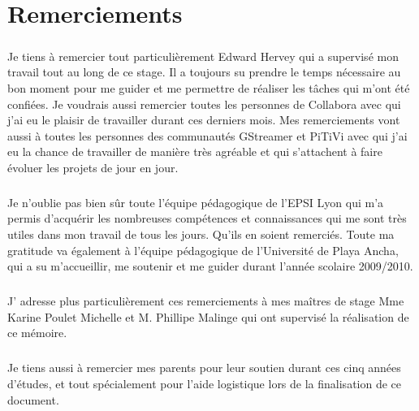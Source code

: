 \newpage \chapter*{Remerciements}

\paragraph {}

Je tiens à remercier tout particulièrement Edward Hervey qui a
supervisé mon travail tout au long de ce stage. Il a toujours su prendre
le temps nécessaire au bon moment pour me guider et me permettre
de réaliser les tâches qui m'ont été confiées.
Je voudrais aussi remercier toutes les personnes de Collabora
avec qui j'ai eu le plaisir de travailler durant ces derniers mois.
Mes remerciements vont aussi à toutes les personnes des communautés GStreamer
et PiTiVi avec qui j'ai eu la chance de travailler de manière très
agréable et qui s'attachent à faire évoluer les projets de jour en jour.

\paragraph {}

Je n'oublie pas bien sûr toute l'équipe pédagogique de l'EPSI Lyon
qui m'a permis d'acquérir les nombreuses compétences et connaissances
qui me sont très utiles dans mon travail de tous les jours. Qu'ils en soient remerciés.
Toute ma gratitude va également à l'équipe pédagogique de l'Université de Playa Ancha,
qui a su m'accueillir, me soutenir et me guider durant l'année scolaire 2009/2010.

\paragraph {}

J' adresse plus particulièrement ces remerciements à mes maîtres de
stage Mme Karine Poulet Michelle et M. Phillipe Malinge qui ont
supervisé la réalisation de ce mémoire.

\paragraph {}

Je tiens aussi à remercier mes parents pour leur soutien durant ces
cinq années d'études, et tout spécialement pour l'aide logistique lors de la
finalisation de ce document.
